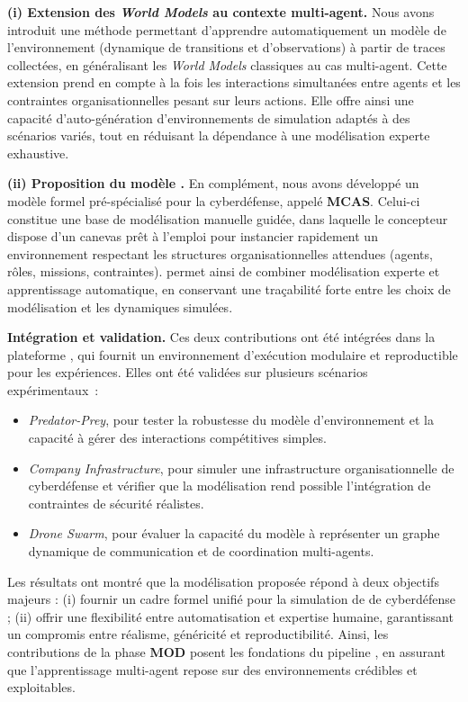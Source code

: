 \medskip
\noindent
\textbf{(i) Extension des \textit{World Models} au contexte multi-agent.}
Nous avons introduit une méthode permettant d’apprendre automatiquement un modèle de l’environnement (dynamique de transitions et d’observations) à partir de traces collectées, en généralisant les \textit{World Models} classiques au cas multi-agent.
Cette extension prend en compte à la fois les interactions simultanées entre agents et les contraintes organisationnelles pesant sur leurs actions.
Elle offre ainsi une capacité d’auto-génération d’environnements de simulation adaptés à des scénarios variés, tout en réduisant la dépendance à une modélisation experte exhaustive.

\medskip
\noindent
\textbf{(ii) Proposition du modèle .}
En complément, nous avons développé un modèle formel  pré-spécialisé pour la cyberdéfense, appelé \textbf{MCAS}.
Celui-ci constitue une base de modélisation manuelle guidée, dans laquelle le concepteur dispose d’un canevas prêt à l’emploi pour instancier rapidement un environnement respectant les structures organisationnelles attendues (agents, rôles, missions, contraintes).
 permet ainsi de combiner modélisation experte et apprentissage automatique, en conservant une traçabilité forte entre les choix de modélisation et les dynamiques simulées.

\medskip
\noindent
\textbf{Intégration et validation.}
Ces deux contributions ont été intégrées dans la plateforme , qui fournit un environnement d’exécution modulaire et reproductible pour les expériences.
Elles ont été validées sur plusieurs scénarios expérimentaux~:
\begin{itemize}
  \item \textit{Predator-Prey}, pour tester la robustesse du modèle d’environnement et la capacité à gérer des interactions compétitives simples.
  \item \textit{Company Infrastructure}, pour simuler une infrastructure organisationnelle de cyberdéfense et vérifier que la modélisation rend possible l’intégration de contraintes de sécurité réalistes.
  \item \textit{Drone Swarm}, pour évaluer la capacité du modèle à représenter un graphe dynamique de communication et de coordination multi-agents.
\end{itemize}

\noindent
Les résultats ont montré que la modélisation proposée répond à deux objectifs majeurs :
(i) fournir un cadre formel unifié pour la simulation de  de cyberdéfense ;
(ii) offrir une flexibilité entre automatisation et expertise humaine, garantissant un compromis entre réalisme, généricité et reproductibilité.
Ainsi, les contributions de la phase \textbf{MOD} posent les fondations du pipeline , en assurant que l’apprentissage multi-agent repose sur des environnements crédibles et exploitables.


